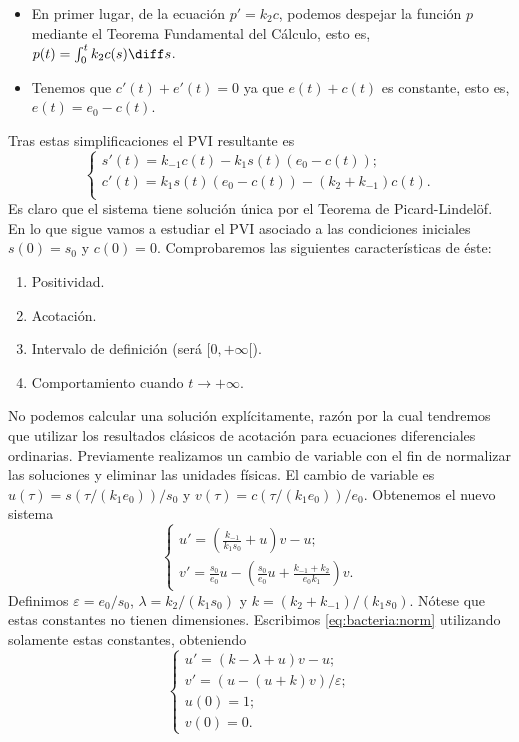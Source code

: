 \documentclass{article}
\begin{document}
\begin{ex}
  \begin{itemize}
  \item En primer lugar, de la ecuación $p' = k_2 c$, podemos despejar la función $p$ mediante el
    Teorema Fundamental del Cálculo, esto es, $p(t) = \int_0^{t} k_2c(s) \diff s$.
  \item Tenemos que $c'(t) + e'(t) = 0$ ya que $e(t)+c(t)$ es constante, esto es,
    $e(t) = e_0 - c(t)$.
  \end{itemize}
  Tras estas simplificaciones el PVI resultante es
  \begin{equation}
    \label{eq:bacteria:simplificada}
    \begin{cases}
      s'(t) = k_{-1}c(t) - k_1 s(t) (e_0 - c(t)); \\
      c'(t) = k_1 s(t) (e_0 - c(t)) - (k_2 + k_{-1})c(t). \\
    \end{cases}
  \end{equation}
  Es claro que el sistema tiene solución única por el Teorema de Picard-Lindelöf. En lo que sigue
  vamos a estudiar el PVI asociado a las condiciones iniciales $s(0) = s_0$ y $c(0) =
  0$. Comprobaremos las siguientes características de éste:
  \begin{enumerate}
  \item Positividad.
  \item Acotación.
  \item Intervalo de definición (será $[0, +\infty[$).
  \item Comportamiento cuando $t \to +\infty$.
  \end{enumerate}
  No podemos calcular una solución explícitamente, razón por la cual tendremos que utilizar los
  resultados clásicos de acotación para ecuaciones diferenciales ordinarias. Previamente realizamos
  un cambio de variable con el fin de normalizar las soluciones y eliminar las unidades físicas. El
  cambio de variable es $u(\tau) = s(\tau / (k_1 e_0)) / s_0$ y
  $v(\tau) = c(\tau / (k_1 e_0)) / e_0$. Obtenemos el nuevo sistema
  \begin{equation}
    \label{eq:bacteria:norm}
    \begin{cases}
      u' = \left(\frac{k_{-1}}{k_1 s_0} + u \right) v -u; \\
      v' = \frac{s_0}{e_0} u - \left( \frac{s_0}{e_0} u + \frac{k_{-1} + k_2}{e_0k_1} \right)v.
    \end{cases}
  \end{equation}
  Definimos $\varepsilon = e_0 / s_0$, $\lambda = k_2 / (k_1 s_0)$ y
  $k = (k_2 + k_{-1}) / (k_1 s_0)$. Nótese que estas constantes no tienen dimensiones. Escribimos
  \eqref{eq:bacteria:norm} utilizando solamente estas constantes, obteniendo
  \begin{equation}
    \label{eq:bacteria:adi}
    \begin{cases}
      u' = \left(k-\lambda +u \right) v - u; \\
      v' =  (u - (u+k)v) / \varepsilon; \\
      u(0) = 1; \\
      v(0) = 0.
    \end{cases}
  \end{equation}


\end{ex}
\end{document}
